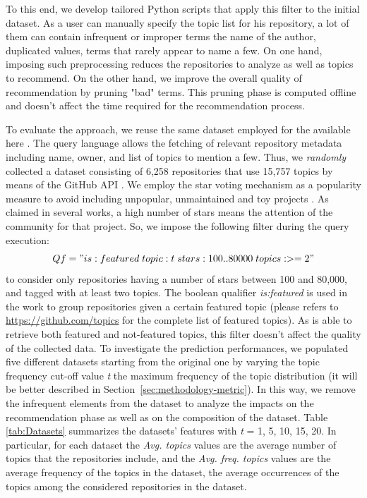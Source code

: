 To this end, we develop tailored Python scripts that apply this filter to the initial dataset. As a \GH user can manually specify the topic list for his repository, a lot of them can contain infrequent or improper terms \ie the name of the author, duplicated values, terms that rarely appear to name a few. On one hand, imposing such preprocessing reduces the repositories to analyze as well as topics to recommend. On the other hand, we improve the overall quality of recommendation by pruning "bad" terms. 
This pruning phase is computed offline and doesn't affect the time required for the recommendation process. 






To evaluate the approach, we reuse the same dataset employed for the \MNB available here \cite{MNBreplication}. The \GH query language \cite{understanding} allows the fetching of relevant repository metadata including name, owner, and list of topics to mention a few. Thus, we \emph{randomly} collected a dataset consisting of 6,258 repositories that use 15,757 topics by means of the GitHub API \cite{pygithub/pygithub_2019}. We employ the \GH star voting mechanism as a popularity measure to avoid including unpopular, unmaintained and toy projects \cite{borges_whats_2018}. As claimed in several works\cite{borges_popularity_2017, borges_predicting_2016}, a high number of stars means the attention of the community for that project. So, we impose the following filter during the query execution:
\begin{equation}
\small
Qf = "is:featured \; topic:t \; stars:100..80000 \; topics:>=2"
\end{equation}%
to consider only \GH repositories having a number of stars between 100 and 80,000, and tagged with at least two topics. The boolean qualifier \emph{is:featured} is used in the \MNB work to group repositories given a certain featured topic (please refers to \url{https://github.com/topics} for the complete list of featured topics). As \CT is able to retrieve both featured and not-featured topics, this filter doesn't affect the quality of the collected data.
To investigate the \CT prediction performances, we populated five different datasets starting from the original one by varying the topic frequency cut-off value \emph{t} \ie the maximum frequency of the topic distribution (it will be better described in Section~\ref{sec:methodology-metric}). In this way, we remove the infrequent elements from the dataset to analyze the impacts on the recommendation phase as well as on the composition of the dataset. Table \ref{tab:Datasets} summarizes the datasets' features with \emph{t} = 1, 5, 10, 15, 20. In particular, for each dataset the \emph{Avg. topics} values are the average number of topics that the repositories include, and the  \emph{Avg. freq. topics} values are the average frequency of the topics in the dataset, \ie the average occurrences of the topics among  the considered repositories in the dataset.


